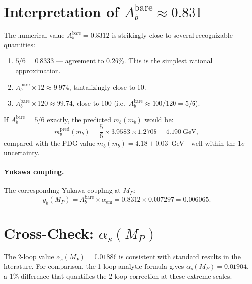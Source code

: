 \documentclass[11pt]{article}
\begin{document}
\section{Interpretation of $A_b^{\mathrm{bare}} \approx 0.831$}

The numerical value $A_b^{\mathrm{bare}} = 0.8312$ is strikingly close to several recognizable quantities:

\begin{enumerate}
\item \textbf{$5/6 = 0.8333$} --- agreement to 0.26\%. This is the simplest rational approximation.

\item $A_b^{\mathrm{bare}} \times 12 \approx 9.974$, tantalizingly close to 10.

\item $A_b^{\mathrm{bare}} \times 120 \approx 99.74$, close to 100 (i.e.\ $A_b^{\mathrm{bare}} \approx 100/120 = 5/6$).
\end{enumerate}

If $A_b^{\mathrm{bare}} = 5/6$ exactly, the predicted $m_b(m_b)$ would be:
\begin{equation}
m_b^{\mathrm{pred}}(m_b) = \frac{5}{6} \times 3.9583 \times 1.2705 = 4.190~\text{GeV},
\end{equation}
compared with the PDG value $m_b(m_b) = 4.18 \pm 0.03$~GeV---well within the $1\sigma$ uncertainty.

\paragraph{Yukawa coupling.}
The corresponding Yukawa coupling at $M_P$:
\begin{equation}
y_b(M_P) = A_b^{\mathrm{bare}} \times \alpha_{\mathrm{em}} = 0.8312 \times 0.007297 = 0.006065.
\end{equation}

\section{Cross-Check: $\alpha_s(M_P)$}

The 2-loop value $\alpha_s(M_P) = 0.01886$ is consistent with standard results in the literature. For comparison, the 1-loop analytic formula gives $\alpha_s(M_P) = 0.01904$, a 1\% difference that quantifies the 2-loop correction at these extreme scales.
\end{document}
